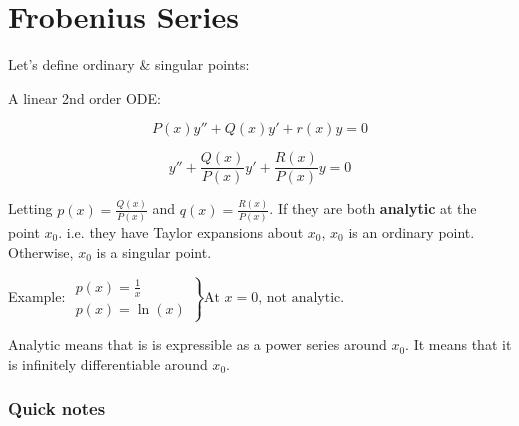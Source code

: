 \documentclass{article}
\begin{document}
\section{Frobenius Series}

Let's define ordinary \& singular points:

A linear 2nd order ODE:

$$P(x) y'' + Q(x) y' + r(x) y = 0$$

$$y'' + \frac{Q(x)}{P(x)} y' + \frac{R(x)}{P(x)} y = 0$$

Letting $p(x) = \frac{Q(x)}{P(x)}$ and $q(x) = \frac{R(x)}{P(x)}$. If they are both \textbf{analytic} at the point $x_0$. i.e. they have Taylor expansions about $x_0$, $x_0$ is an ordinary point. Otherwise, $x_0$ is a singular point. 

Example: $\left. \begin{matrix} p(x) = \frac{1}{x} \\ p(x) = \ln(x) \end{matrix} \right\} \text{At } x = 0 \text{, not analytic}$.

Analytic means that is is expressible as a power series around $x_0$. It means that it is infinitely differentiable around $x_0$. 

\subsubsection{Quick notes}
\end{document}
